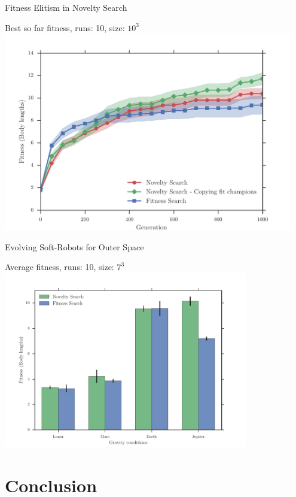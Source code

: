 \documentclass[6pt]{beamer}
\begin{document}
{\begin{frame}{Fitness Elitism in Novelty Search}
\begin{block}{Best so far fitness, runs: 10, size: $10^3$}
\centering
\includegraphics[width=0.95\textwidth]{../Figures/Results/CopyFitChampions10.pdf}
\end{block}
\end{frame}

\begin{frame}{Evolving Soft-Robots for Outer Space}
\begin{block}{Average fitness, runs: 10, size: $7^3$}
\centering
\includegraphics[width=0.8\textwidth]{../Figures/Results/GravityExperiment.pdf}
\end{block}
\end{frame}
}








\section{Conclusion}
\end{document}
